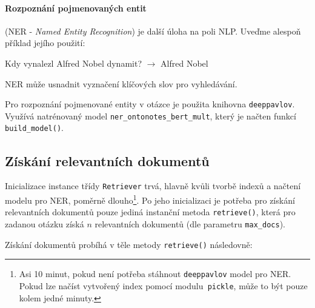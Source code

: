 \paragraph{Rozpoznání pojmenovaných entit}(NER - \emph{Named Entity Recognition}) je další úloha na poli NLP. Uveďme alespoň příklad jejího použití:
\begin{center}
    Kdy vynalezl Alfred Nobel dynamit? $\longrightarrow$ Alfred Nobel
\end{center}
NER může usnadnit vyznačení klíčových slov pro vyhledávání.\par
Pro rozpoznání pojmenované entity v otázce je použita knihovna \texttt{deeppavlov}. Využívá natrénovaný model \texttt{ner\_ontonotes\_bert\_mult}, který je načten funkcí \texttt{build\_model()}.

\subsection{Získání relevantních dokumentů}
Inicializace instance třídy \texttt{Retriever} trvá, hlavně kvůli tvorbě indexů a načtení modelu pro NER, poměrně dlouho\footnote{Asi 10 minut, pokud není potřeba stáhnout \texttt{deeppavlov} model pro NER. Pokud lze načíst vytvořený index pomocí modulu\texttt{ pickle}, může to být pouze kolem jedné minuty.}. Po jeho inicializaci je potřeba pro získání relevantních dokumentů pouze jediná instanční metoda \texttt{retrieve()}, která pro zadanou otázku získá $n$ relevantních dokumentů (dle parametru \texttt{max\_docs}).\par
Získání dokumentů probíhá v těle metody \texttt{retrieve()} následovně:
